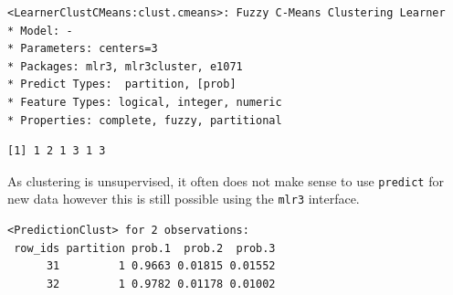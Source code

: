 \begin{verbatim}
<LearnerClustCMeans:clust.cmeans>: Fuzzy C-Means Clustering Learner
* Model: -
* Parameters: centers=3
* Packages: mlr3, mlr3cluster, e1071
* Predict Types:  partition, [prob]
* Feature Types: logical, integer, numeric
* Properties: complete, fuzzy, partitional
\end{verbatim}

\begin{Shaded}
\begin{Highlighting}[]
\SpecialCharTok{$}
\SpecialCharTok{$}\NormalTok{assignments[}\SpecialCharTok{$}\NormalTok{)]}
\end{Highlighting}
\end{Shaded}

\begin{verbatim}
[1] 1 2 1 3 1 3
\end{verbatim}

As clustering is unsupervised, it often does not make sense to use
\texttt{predict} for new data however this is still possible using the
\texttt{mlr3} interface.

\begin{Shaded}
\begin{Highlighting}[]
\SpecialCharTok{$}\SpecialCharTok{:}\NormalTok{)}\SpecialCharTok{$}\SpecialCharTok{:}\NormalTok{)}
\end{Highlighting}
\end{Shaded}

\begin{verbatim}
<PredictionClust> for 2 observations:
 row_ids partition prob.1  prob.2  prob.3
      31         1 0.9663 0.01815 0.01552
      32         1 0.9782 0.01178 0.01002
\end{verbatim}

\begin{Shaded}
\begin{Highlighting}[]
\OtherTok{=}\SpecialCharTok{$}\SpecialCharTok{$}
\end{Highlighting}
\end{Shaded}

